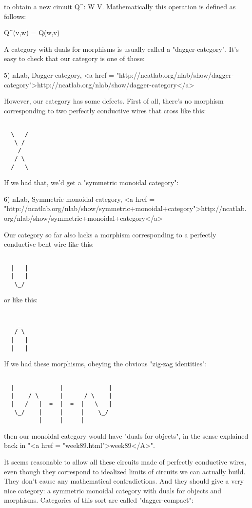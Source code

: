 to obtain a new circuit Q^{\dagger }: W \to  V.
Mathematically this operation is defined as follows:

Q^{\dagger }(v,w) = Q(w,v)

A category with duals for morphisms is usually called a
"dagger-category".  It's easy to check that our category is
one of those:

5) nLab, Dagger-category, <a href = "http://ncatlab.org/nlab/show/dagger-category">http://ncatlab.org/nlab/show/dagger-category</a>

However, our category has some defects.  First of all, there's no
morphism corresponding to two perfectly conductive wires that cross
like this:


\begin{verbatim}

  \   /
   \ /
    /
   / \
  /   \
\end{verbatim}
    
If we had that, we'd get a "symmetric monoidal category":

6) nLab, Symmetric monoidal category, 
<a href = "http://ncatlab.org/nlab/show/symmetric+monoidal+category">http://ncatlab.org/nlab/show/symmetric+monoidal+category</a>

Our category so far also lacks a morphism corresponding to a perfectly
conductive bent wire like this:


\begin{verbatim}

  |   |
  |   |
   \_/
\end{verbatim}
    

or like this:


\begin{verbatim}

    _
   / \
  |   |
  |   |
\end{verbatim}
    

If we had these morphisms, obeying the obvious "zig-zag identities":


\begin{verbatim}

  |     _       |       _     |
  |    / \      |      / \    |
  |   /   |  =  |  =  |   \   |
   \_/    |     |     |    \_/
          |     |     |
\end{verbatim}
    
then our monoidal category would have "duals for objects", in the
sense explained back in "<a href = "week89.html">week89</A>".  

It seems reasonable to allow all these circuits made of perfectly
conductive wires, even though they correspond to idealized limits of
circuits we can actually build.  They don't cause any mathematical
contradictions.  And they should give a very nice category: a
symmetric monoidal category with duals for objects and morphisms.
Categories of this sort are called "dagger-compact":


